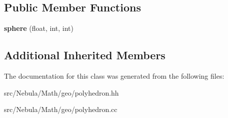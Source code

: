 \subsection*{Public Member Functions}
\begin{DoxyCompactItemize}
\item 
\hypertarget{classmath_1_1geo_1_1sphere_ad30f9edddc96ef9c7a4062e79694556d}{{\bfseries sphere} (float, int, int)}\label{classmath_1_1geo_1_1sphere_ad30f9edddc96ef9c7a4062e79694556d}

\end{DoxyCompactItemize}
\subsection*{Additional Inherited Members}


The documentation for this class was generated from the following files\-:\begin{DoxyCompactItemize}
\item 
src/\-Nebula/\-Math/geo/polyhedron.\-hh\item 
src/\-Nebula/\-Math/geo/polyhedron.\-cc\end{DoxyCompactItemize}
